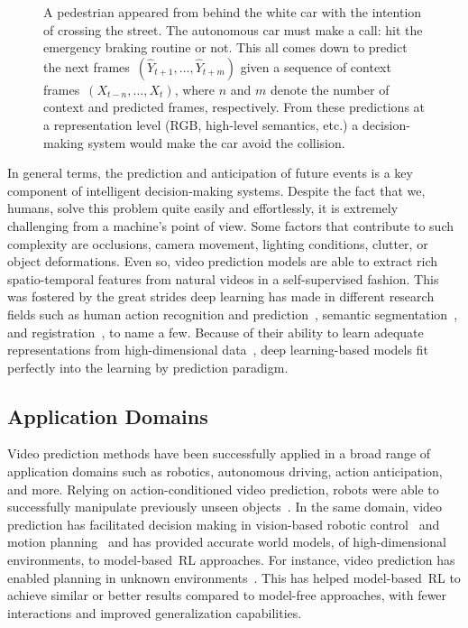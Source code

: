 \begin{figure}[!hbt]
	\centering
	\resizebox{0.75\textwidth}{!}{
		}
	\caption{A pedestrian appeared from behind the white car with the intention of crossing the street. The autonomous car must make a call: hit the emergency braking routine or not. This all comes down to predict the next frames~$(\hat{Y}_{t+1},\ldots,\hat{Y}_{t+m})$ given a sequence of context frames~$(X_{t-n}, \ldots, X_{t})$, where $n$ and $m$ denote the number of context and predicted frames, respectively. From these predictions at a representation level (\acs{RGB}, high-level semantics, etc.) a decision-making system would make the car avoid the collision.}
	\label{fig:pedestrian}
\end{figure}

In general terms, the prediction and anticipation of future events is a key component of intelligent decision-making systems. Despite the fact that we, humans, solve this problem quite easily and effortlessly,
it is extremely challenging from a machine's point of view.
Some factors that contribute to such complexity are occlusions, camera movement, lighting conditions, clutter, or object deformations. Even so, video prediction models are able to extract rich spatio-temporal features from natural videos in a self-supervised fashion. This was fostered by the great strides deep learning has made in different research fields such as human action recognition and prediction~\cite{Kong2018}, semantic segmentation~\cite{Garcia2018a}, and registration~\cite{Villena2020}, to name a few. Because of their ability to learn adequate representations from high-dimensional data~\cite{LeCun2015}, deep learning-based models fit perfectly into the learning by prediction paradigm.

\subsection{Application Domains}
Video prediction methods have been successfully applied in a broad range of application domains such as robotics, autonomous driving, action anticipation, and more. Relying on action-conditioned video prediction, robots were able to successfully manipulate previously unseen objects~\cite{Finn2016}. In the same domain, video prediction has facilitated decision making in vision-based robotic control~\cite{Ebert2018} and motion planning~\cite{Koppula2016,Xie2019} and has provided accurate world models, of high-dimensional environments, to model-based~\ac{RL} approaches. For instance, video prediction has enabled planning in unknown environments~\cite{Hafner2019, Kaiser2020}. This has helped model-based~\ac{RL} to achieve similar or better results compared to model-free approaches, with fewer interactions and improved generalization capabilities.

